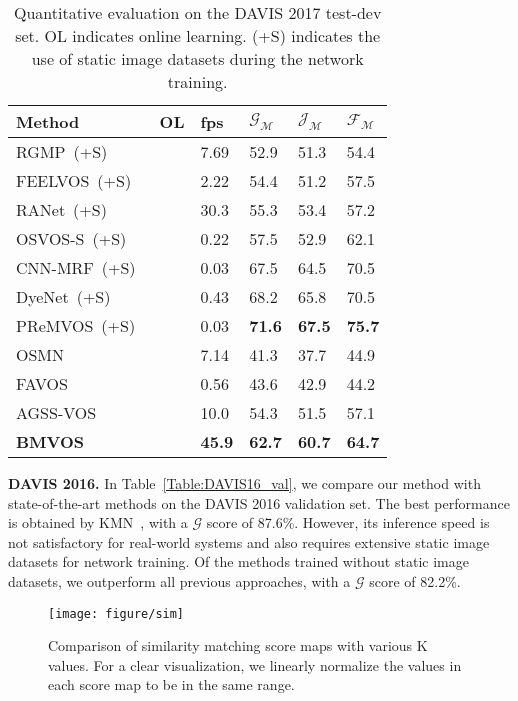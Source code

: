 \documentclass[10pt,twocolumn,letterpaper]{article}
\begin{document}
	
	\begin{table}
		\centering 
		\caption{Quantitative evaluation on the DAVIS 2017 test-dev set. OL indicates online learning. (+S) indicates the use of static image datasets during the network training.}
		\vspace{2mm}
		\small
		\begin{tabular}{lP{0.58cm}P{0.58cm}P{0.58cm}P{0.58cm}P{0.58cm}}
			\toprule
			Method &OL &fps &$\mathcal{G}_\mathcal{M}$ &$\mathcal{J}_\mathcal{M}$ &$\mathcal{F}_\mathcal{M}$\\
			\midrule
			RGMP~(+S)~\cite{RGMP} & &7.69 &52.9 &51.3 &54.4\\
			FEELVOS~(+S)~\cite{FEELVOS} & &2.22 &54.4 &51.2 &57.5\\
			RANet~(+S)~\cite{RANet} & &30.3 &55.3 &53.4 &57.2\\
			OSVOS-S~(+S)~\cite{OSVOS-S} &\checkmark &0.22 &57.5 &52.9 &62.1\\
			CNN-MRF~(+S)~\cite{CNN-MRF} &\checkmark &0.03 &67.5 &64.5 &70.5\\
			DyeNet~(+S)~\cite{DyeNet} &\checkmark &0.43 &68.2 &65.8 &70.5\\
			PReMVOS~(+S)~\cite{PReMVOS} &\checkmark &0.03 &\textbf{71.6} &\textbf{67.5} &\textbf{75.7}\\
			\midrule
			OSMN~\cite{OSMN} & &7.14 &41.3 &37.7 &44.9\\
			FAVOS~\cite{FAVOS} & &0.56 &43.6 &42.9 &44.2\\
			AGSS-VOS~\cite{AGSS-VOS} & &10.0 &54.3 &51.5 &57.1\\
			\midrule
			\textbf{BMVOS} & &\textbf{45.9} &\textbf{62.7} &\textbf{60.7} &\textbf{64.7}\\
			\bottomrule
		\end{tabular}
		\label{Table:DAVIS17_test}
	\end{table}
	

	\noindent\textbf{DAVIS 2016.} In Table~\ref{Table:DAVIS16_val}, we compare our method with state-of-the-art methods on the DAVIS 2016 validation set. The best performance is obtained by KMN~\cite{KMN}, with a $\mathcal{G}$ score of 87.6\%. However, its inference speed is not satisfactory for real-world systems and also requires extensive static image datasets for network training. Of the methods trained without static image datasets, we outperform all previous approaches, with a $\mathcal{G}$ score of 82.2\%.
	
	
	\begin{figure*}[t]
		\centering
		\texttt{[image: figure/sim]}
		\caption{Comparison of similarity matching score maps with various K values. For a clear visualization, we linearly normalize the values in each score map to be in the same range.}
		\label{figure5}
	\end{figure*}
	
\end{document}
